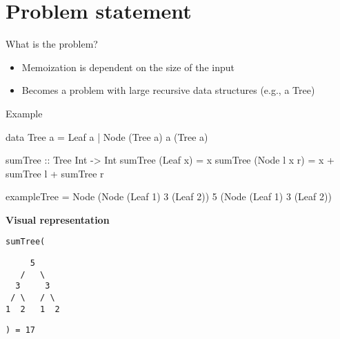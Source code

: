 \section{Problem statement}

\begin{slide}{What is the problem?}
\begin{itemize}
  \item Memoization is dependent on the size of the input
  \item Becomes a problem with large recursive data structures (e.g., a Tree)
\end{itemize}
\end{slide}


\begin{slide}{Example}
\begin{haskell}
data Tree a = Leaf a | Node (Tree a) a (Tree a)

sumTree :: Tree Int -> Int
sumTree (Leaf x)     = x
sumTree (Node l x r) = x + sumTree l + sumTree r

exampleTree = Node (Node (Leaf 1) 3 (Leaf 2)) 5 (Node (Leaf 1) 3 (Leaf 2))
\end{haskell}

\begin{center}
\textbf{Visual representation}

\begin{minipage}{.1\textwidth}
\texttt{sumTree(}
\end{minipage}
\begin{minipage}{.2\textwidth}
\begin{center}
\begin{verbatim}
     5 
   /   \
  3     3
 / \   / \
1  2   1  2
\end{verbatim}
\end{center}
\end{minipage}
\begin{minipage}{.1\textwidth}
\texttt{) = 17}
\end{minipage}
\end{center}
\end{slide}


